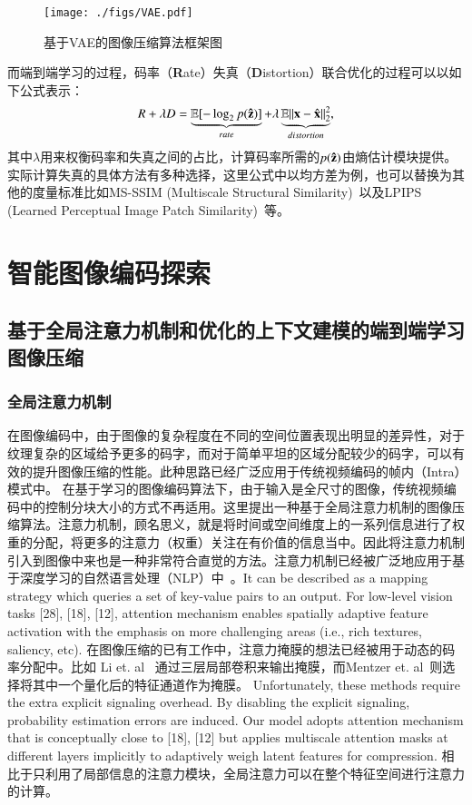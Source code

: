 \documentclass[macfonts,phd,oneside,nobackinfo]{njuthesis}
\begin{document}
\begin{figure}[htbp]
\centering
\texttt{[image: ./figs/VAE.pdf]}
\caption{基于VAE的图像压缩算法框架图}
\label{fig:vae}
\end{figure}

而端到端学习的过程，码率（\textbf{R}ate）失真（\textbf{D}istortion）联合优化的过程可以以如下公式表示：
\begin{equation}
R + \lambda D = \underbrace{\mathbb{E}[-\log_2p({\bf \hat{z}})]}_{rate}+\lambda\underbrace{\mathbb{E}||{\bf x}-\hat{\bf x}||_2^2}_{distortion},
\end{equation}
其中$\lambda$用来权衡码率和失真之间的占比，计算码率所需的$p({\bf \hat{z}})$由熵估计模块提供。实际计算失真的具体方法有多种选择，这里公式中以均方差为例，也可以替换为其他的度量标准比如MS-SSIM (Multiscale Structural Similarity)~\cite{MS-SSIM}以及LPIPS (Learned Perceptual Image Patch Similarity)~\cite{zhang2018unreasonable}等。

\chapter{智能图像编码探索}



\section{基于全局注意力机制和优化的上下文建模的端到端学习图像压缩}\label{sec:rate}

\subsection{全局注意力机制}
在图像编码中，由于图像的复杂程度在不同的空间位置表现出明显的差异性，对于纹理复杂的区域给予更多的码字，而对于简单平坦的区域分配较少的码字，可以有效的提升图像压缩的性能。此种思路已经广泛应用于传统视频编码的帧内（Intra）模式中。
在基于学习的图像编码算法下，由于输入是全尺寸的图像，传统视频编码中的控制分块大小的方式不再适用。这里提出一种基于全局注意力机制的图像压缩算法。注意力机制，顾名思义，就是将时间或空间维度上的一系列信息进行了权重的分配，将更多的注意力（权重）关注在有价值的信息当中。因此将注意力机制引入到图像中来也是一种非常符合直觉的方法。注意力机制已经被广泛地应用于基于深度学习的自然语言处理（NLP）中~\cite{luong2015effective, firat2016multi, vaswani2017attention}。It can be described as a mapping strategy which queries a set of key-value pairs to an output. For low-level vision tasks [28], [18], [12], attention mechanism enables spatially adaptive feature activation with the emphasis on more challenging areas (i.e., rich textures, saliency, etc).
在图像压缩的已有工作中，注意力掩膜的想法已经被用于动态的码率分配中。比如 Li et. al	~\cite{li2017learning}通过三层局部卷积来输出掩膜，而Mentzer et. al~\cite{mentzer2018conditional}则选择将其中一个量化后的特征通道作为掩膜。 
Unfortunately, these methods require the extra explicit signaling overhead. By disabling the explicit signaling, probability estimation errors are induced. Our model adopts attention mechanism that is conceptually close to [18], [12] but applies multiscale attention masks at different layers implicitly to adaptively weigh latent features for compression.
相比于只利用了局部信息的注意力模块，全局注意力可以在整个特征空间进行注意力的计算。
\end{document}

